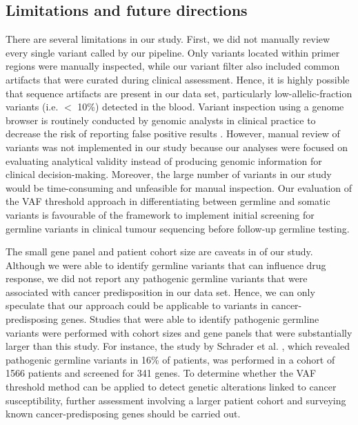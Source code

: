 \subsection{Limitations and future directions}

There are several limitations in our study. First, we did not manually review every single variant called by our pipeline. Only variants located within primer regions were manually inspected, while our variant filter also included common artifacts that were curated during clinical assessment. Hence, it is highly possible that sequence artifacts are present in our data set, particularly low-allelic-fraction variants (i.e. $<$ 10\%) detected in the blood. Variant inspection using a genome browser is routinely conducted by genomic analysts in clinical practice to decrease the risk of reporting false positive results \cite{Strom2016, Garofalo2016}. However, manual review of variants was not implemented in our study because our analyses were focused on evaluating analytical validity instead of producing genomic information for clinical decision-making. Moreover, the large number of variants in our study would be time-consuming and unfeasible for manual inspection. Our evaluation of the VAF threshold approach in differentiating between germline and somatic variants is favourable of the framework to implement initial screening for germline variants in clinical tumour sequencing before follow-up germline testing.

The small gene panel and patient cohort size are caveats in of our study. Although we were able to identify germline variants that can influence drug response, we did not report any pathogenic germline variants that were associated with cancer predisposition in our data set. Hence, we can only speculate that our approach could be applicable to variants in cancer-predisposing genes. Studies that were able to identify pathogenic germline variants were performed with cohort sizes and gene panels that were substantially larger than this study. For instance, the study by Schrader et al. \cite{Schrader2015}, which revealed pathogenic germline variants in 16\% of patients, was performed in a cohort of 1566 patients and screened for 341 genes. To determine whether the VAF threshold method can be applied to detect genetic alterations linked to cancer susceptibility, further assessment involving a larger patient cohort and surveying known cancer-predisposing genes should be carried out.

